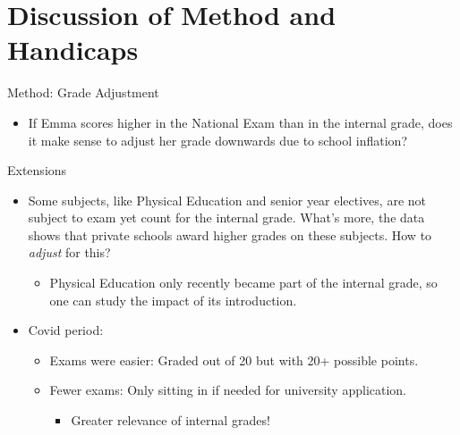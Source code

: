 \documentclass{beamer}
\begin{document}
\section{Discussion of Method and Handicaps}
\begin{frame}{Method: Grade Adjustment}
    \begin{itemize}
        \item If Emma scores higher in the National Exam than in the internal grade, does it make sense to adjust her grade downwards due to school inflation?   
    \end{itemize}
    
\end{frame}

\begin{frame}{Extensions}
    \begin{itemize}
        \item Some subjects, like Physical Education and senior year electives, are not subject to exam yet count for the internal grade. What's more, the data shows that private schools award higher grades on these subjects. How to \textit{adjust} for this?
        \begin{itemize}
            \item Physical Education only recently became part of the internal grade, so one can study the impact of its introduction.
        \end{itemize}
        \item Covid period:
        \begin{itemize}
            \item Exams were easier: Graded out of 20 but with 20+ possible points.
            \item Fewer exams: Only sitting in if needed for university application.
            \begin{itemize}
                \item Greater relevance of internal grades!
            \end{itemize} 
        \end{itemize}
       
    \end{itemize}
    
\end{frame}
\end{document}
